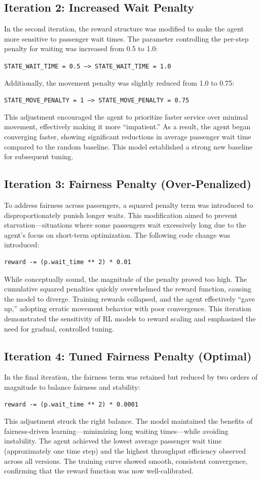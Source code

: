 \documentclass[conference]{IEEEtran}
\begin{document}
\subsection{Iteration 2: Increased Wait Penalty}
In the second iteration, the reward structure was modified to make the agent more sensitive to passenger wait times. The parameter controlling the per-step penalty for waiting was increased from 0.5 to 1.0:

\texttt{STATE\_WAIT\_TIME = 0.5 --> STATE\_WAIT\_TIME = 1.0}

Additionally, the movement penalty was slightly reduced from 1.0 to 0.75:

\texttt{STATE\_MOVE\_PENALTY = 1 --> STATE\_MOVE\_PENALTY = 0.75}

This adjustment encouraged the agent to prioritize faster service over minimal movement, effectively making it more “impatient.” As a result, the agent began converging faster, showing significant reductions in average passenger wait time compared to the random baseline. This model established a strong new baseline for subsequent tuning.

\subsection{Iteration 3: Fairness Penalty (Over-Penalized)}
To address fairness across passengers, a squared penalty term was introduced to disproportionately punish longer waits. This modification aimed to prevent starvation—situations where some passengers wait excessively long due to the agent’s focus on short-term optimization. The following code change was introduced:
\begin{verbatim}
reward -= (p.wait_time ** 2) * 0.01
\end{verbatim}
While conceptually sound, the magnitude of the penalty proved too high. The cumulative squared penalties quickly overwhelmed the reward function, causing the model to diverge. Training rewards collapsed, and the agent effectively “gave up,” adopting erratic movement behavior with poor convergence. This iteration demonstrated the sensitivity of RL models to reward scaling and emphasized the need for gradual, controlled tuning.

\subsection{Iteration 4: Tuned Fairness Penalty (Optimal)}
In the final iteration, the fairness term was retained but reduced by two orders of magnitude to balance fairness and stability:
\begin{verbatim}
reward -= (p.wait_time ** 2) * 0.0001
\end{verbatim}
This adjustment struck the right balance. The model maintained the benefits of fairness-driven learning—minimizing long waiting times—while avoiding instability. The agent achieved the lowest average passenger wait time (approximately one time step) and the highest throughput efficiency observed across all versions. The training curve showed smooth, consistent convergence, confirming that the reward function was now well-calibrated.
\end{document}
